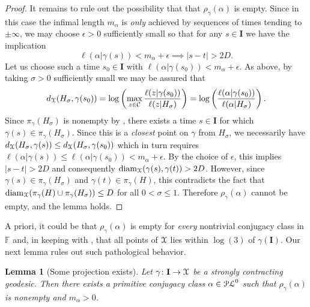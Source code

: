 \documentclass[letterpaper,fleqn]{article}
\theoremstyle{plain}
\newtheorem{lemma}[theorem]{Lemma}
\theoremstyle{definition}
\DeclareMathOperator{\diam}{diam}
\newcommand{\abs}[1]{\left\vert#1\right\vert}
\newcommand{\free}{\mathbb{F}} %
\newcommand{\pl}{{\EuScript{PL}}} %
\newcommand{\os}{{\EuScript X}} %
\newcommand{\len}{\ell}  %
\newcommand{\cp}{\pi} %
\newcommand{\minlen}{m}  %
\newcommand{\minpts}{\rho} %
\renewcommand{\diam}{\mathrm{diam}}
\newcommand{\I}{\mathbf{I}}
\begin{document}
\begin{proof}
It remains to rule out the possibility that that $\minpts_\gamma(\alpha)$ is empty. Since in this case the infimal length $\minlen_\alpha$ is \emph{only} achieved by sequences of times tending to $\pm\infty$, we may choose $\epsilon > 0$ sufficiently small so that for any $s\in \I$ we have the implication
\[\len(\alpha\vert \gamma(s)) < \minlen_\alpha + \epsilon \implies \abs{s-t} > 2D.\]
Let us choose such a time $s_0\in\I$ with $\len(\alpha\vert \gamma(s_0)) < \minlen_\alpha + \epsilon$. As above, by taking $\sigma > 0$ sufficiently small we may be assured that 
\[d_\os(H_\sigma,\gamma(s_0)) =  \log\left(\max_{z\in \mathcal{C}} \frac{\len(z\vert \gamma(s_0))}{\len(z\vert H_\sigma)}\right) =  \log\left(\frac{\len(\alpha\vert \gamma(s_0))}{\len(\alpha\vert H_\sigma)}\right) .\]
Since $\cp_\gamma(H_\sigma)$ is nonempty by , there exists a time $s\in \I$ for which $\gamma(s)\in \cp_\gamma(H_\sigma)$. Since this is a \emph{closest} point on $\gamma$ from $H_\sigma$, we necessarily have $d_\os(H_\sigma,\gamma(s))\le d_\os(H_\sigma,\gamma(s_0))$ which in turn requires $\len(\alpha\vert \gamma(s)) \le \len(\alpha\vert \gamma(s_0)) < m_\alpha+\epsilon$. By the choice of $\epsilon$, this implies $\abs{s-t} > 2D$ and consequently $\diam_\os(\gamma(s),\gamma(t))> 2D$. However, since $\gamma(s)\in \cp_\gamma(H_\sigma)$ and $\gamma(t) \in \cp_\gamma(H)$, this contradicts the fact that $\diam_\os(\cp_\gamma(H)\cup\cp_\gamma(H_\sigma))\le D$ for all $0 < \sigma \le 1$. Therefore $\minpts_\gamma(\alpha)$ cannot be empty, and the lemma holds.
\end{proof}

A priori, it could be that $\minpts_\gamma(\alpha)$ is empty for \emph{every} nontrivial conjugacy class in $\free$ and, in keeping with , that all points of $\os$ lies within $\log(3)$ of $\gamma(\I)$. Our next lemma rules out such pathological behavior.

\begin{lemma}[Some projection exists]
\label{lem:one_minimizer_exists}
Let $\gamma\colon\I\to\os$ be a strongly contracting geodesic. Then there exists a primitive conjugacy class $\alpha\in\pl^0$ such that $\minpts_\gamma(\alpha)$ is nonempty and $\minlen_\alpha > 0$.
\end{lemma}
\end{document}
